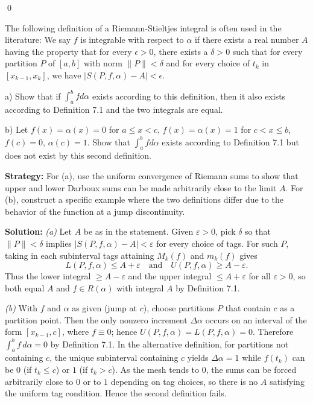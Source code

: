\qed
\begin{problembox}
The following definition of a Riemann-Stieltjes integral is often used in the literature: We say $f$ is integrable with respect to $\alpha$ if there exists a real number $A$ having the property that for every $\epsilon > 0$, there exists a $\delta > 0$ such that for every partition $P$ of $[a, b]$ with norm $\|P\| < \delta$ and for every choice of $t_k$ in $[x_{k-1}, x_k]$, we have $|S(P, f, \alpha) - A| < \epsilon$.

a) Show that if $\int_a^b f d\alpha$ exists according to this definition, then it also exists according to Definition 7.1 and the two integrals are equal.

b) Let $f(x) = \alpha(x) = 0$ for $a \leq x < c$, $f(x) = \alpha(x) = 1$ for $c < x \leq b$, $f(c) = 0$, $\alpha(c) = 1$. Show that $\int_a^b f d\alpha$ exists according to Definition 7.1 but does not exist by this second definition.
\end{problembox}

\noindent\textbf{Strategy:} For (a), use the uniform convergence of Riemann sums to show that upper and lower Darboux sums can be made arbitrarily close to the limit $A$. For (b), construct a specific example where the two definitions differ due to the behavior of the function at a jump discontinuity.

\bigskip\noindent\textbf{Solution:}
\textit{(a)} Let $A$ be as in the statement. Given $\varepsilon>0$, pick $\delta$ so that $\|P\|<\delta$ implies $|S(P,f,\alpha)-A|<\varepsilon$ for every choice of tags. For such $P$, taking in each subinterval tags attaining $M_k(f)$ and $m_k(f)$ gives
\[L(P,f,\alpha)\le A+\varepsilon\quad\text{and}\quad U(P,f,\alpha)\ge A-\varepsilon.
\]
Thus the lower integral $\ge A-\varepsilon$ and the upper integral $\le A+\varepsilon$ for all $\varepsilon>0$, so both equal $A$ and $f\in R(\alpha)$ with integral $A$ by Definition 7.1.

\textit{(b)} With $f$ and $\alpha$ as given (jump at $c$), choose partitions $P$ that contain $c$ as a partition point. Then the only nonzero increment $\Delta\alpha$ occurs on an interval of the form $[x_{k-1},c]$, where $f\equiv 0$; hence $U(P,f,\alpha)=L(P,f,\alpha)=0$. Therefore $\int_a^b f\,d\alpha=0$ by Definition 7.1. In the alternative definition, for partitions not containing $c$, the unique subinterval containing $c$ yields $\Delta\alpha=1$ while $f(t_k)$ can be $0$ (if $t_k\le c$) or $1$ (if $t_k>c$). As the mesh tends to $0$, the sums can be forced arbitrarily close to $0$ or to $1$ depending on tag choices, so there is no $A$ satisfying the uniform tag condition. Hence the second definition fails.




